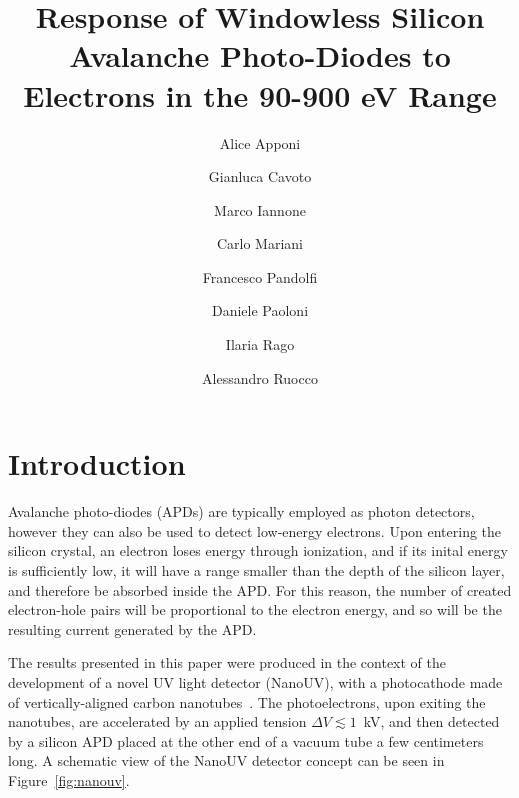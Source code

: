 \documentclass[12p]{paper}
\begin{document}
\title{Response of Windowless Silicon Avalanche Photo-Diodes to Electrons in the 90-900 eV Range}

\author[1]{Alice Apponi}
\author[1]{Gianluca Cavoto}
\author[2]{Marco Iannone}
\author[1]{Carlo Mariani}
\author[2,*]{Francesco Pandolfi}
\author[3]{Daniele Paoloni}
\author[2]{Ilaria Rago}
\author[3]{Alessandro Ruocco}


\maketitle




\newpage
\clearpage


\section{Introduction}


Avalanche photo-diodes (APDs) are typically employed as photon detectors, however they can also be used to detect low-energy electrons. 
Upon entering the silicon crystal, an electron loses energy through ionization, and if its inital energy is sufficiently low, it will have a range smaller than the depth of the silicon layer, and therefore be absorbed inside the APD. For this reason, the number of created electron-hole pairs will be proportional to the electron energy, and so will be the resulting current generated by the APD.

The results presented in this paper were produced in the context of the development of a novel UV light detector (NanoUV), with a photocathode made of vertically-aligned carbon nanotubes~\cite{cavoto, mariani, mariani2}. The photoelectrons, upon exiting the nanotubes, are accelerated by an applied tension $\Delta V \lesssim 1$~kV, and then detected by a silicon APD placed at the other end of a vacuum tube a few centimeters long. A schematic view of the NanoUV detector concept can be seen in Figure~\ref{fig:nanouv}. 
\end{document}
